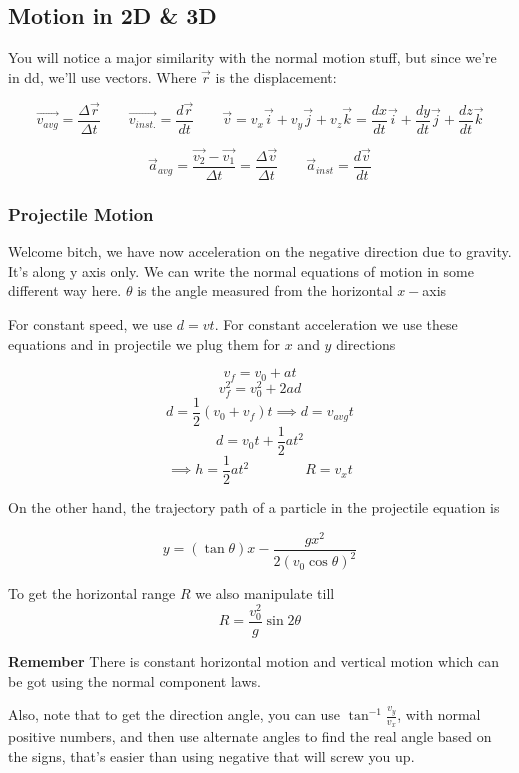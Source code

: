 \documentclass{article}
\begin{document}
\newpage

\subsection{Motion in 2D \& 3D}

You will notice a major similarity with the normal motion stuff, but since we're in dd, we'll use vectors. Where $ \vec{ r } $ is the displacement:

\[
	\vec{ v_{avg} } = \frac{ \varDelta \vec{ r } }{ \varDelta t } 
	\qquad  
	\vec{ v_{inst.} } = \frac{ d \vec{ r } }{ dt } \qquad \vec{ v } = v_x \vec{ i } + v_y \vec{ j } + v_z \vec{ k } = \frac{dx}{dt} \vec{ i } + \frac{dy}{dt} \vec{ j } + \frac{dz}{dt} \vec{ k }
\]

\[
	\vec{ a }_{avg} = \frac{ \vec{ v_2 } -  \vec{ v_1} } { \varDelta t	 } = \frac{ \varDelta	\vec{ v } }{ \varDelta t }
	\qquad \vec{ a }_{inst} = \frac{ d \vec{ v } }{ dt } 
\]

\subsubsection{Projectile Motion}
Welcome bitch, we have now acceleration on the negative direction due to gravity. It's along y axis only. We can write the normal equations of motion in some different way here. $ \theta $ is the angle measured from the horizontal $ x-$axis 

For constant speed, we use $ d = vt $. For constant acceleration we use these equations and in projectile we plug them for $x$ and $  y$ directions

\[
	v_f	=v_0+at
\]
\[
	v_f^2=v_0^2+2ad
\]
\[
	d = \frac{1}{2} (v_0+v_f)t \implies d = v_{avg}t
\]
\[
	d = v_0t+\frac{1}{2}at^2
\]
\[
	\implies h = \frac{1}{2}at^2 \qquad \qquad R = v_xt
\]


On the other hand, the trajectory path of a particle in the projectile equation is

\[
	y = ( \tan{ \theta } )x - \frac{ gx^2 }{ 2(v_0 \cos{ \theta } )^2  } 
\]

To get the horizontal range $R$ we also manipulate till
\[
	R = \frac{ v_0^2 }{g  } \sin{ 2 \theta }  
\]

\textbf{Remember} There is constant horizontal motion and vertical motion which can be got using the normal component laws. 


Also, note that to get the direction angle, you can use $ \tan^{-1}{ \frac{v_y}{v_x} } $, with normal positive numbers, and then use alternate angles to find the real angle based on the signs, that's easier than using negative that will screw you up.
\end{document}
